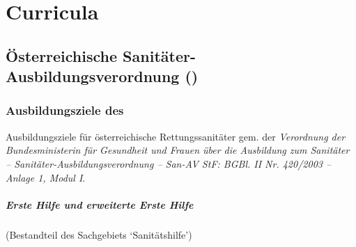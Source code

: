 \chapter{Curricula}
\label{chp:INT}



\section{Österreichische Sanitäter-Ausbildungsverordnung
()}


\subsection{Ausbildungsziele des }




Ausbildungsziele für österreichische Rettungssanitäter gem.
der \emph{Verordnung der Bundesministerin für Gesundheit und
Frauen über die Ausbildung zum Sanitäter --
Sanitäter-Ausbildungsverordnung -- San-AV StF: BGBl. II Nr.
420/2003 -- Anlage 1, Modul I}.


\paragraph{Erste Hilfe und erweiterte Erste Hilfe}
(Bestandteil des Sachgebiets \enquote*{Sanitätshilfe})
  
